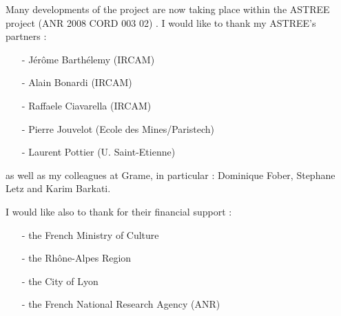 \documentclass[a4paper]{book}
\begin{document}
Many developments of the \faust project are now taking place within the ASTREE project (ANR 2008 CORD 003 02) . I would like to thank my ASTREE's partners :
\begin{itemize}
\item[-]J\'er\^ome Barth\'elemy (IRCAM)
\item[-]Alain Bonardi (IRCAM)
\item[-]Raffaele Ciavarella (IRCAM)
\item[-]Pierre Jouvelot (Ecole des Mines/Paristech)
\item[-]Laurent Pottier (U. Saint-Etienne)
\end{itemize}
as well as my colleagues at Grame, in particular : Dominique Fober, Stephane Letz and Karim Barkati.


I would like also to thank for their financial support :
\begin{itemize}
\item[-]the French Ministry of Culture
\item[-]the Rh\^one-Alpes Region
\item[-]the City of Lyon
\item[-]the French National Research Agency (ANR)
\end{itemize}




\end{document}
